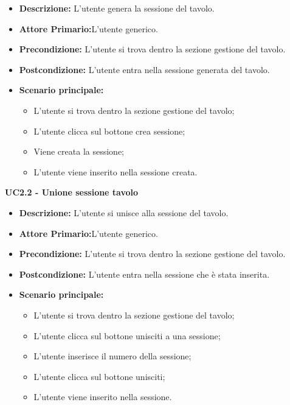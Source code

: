 \begin{itemize}
    \item \textbf{Descrizione:} L'utente genera la sessione del tavolo.
    \item \textbf{Attore Primario:}L'utente generico.
    \item \textbf{Precondizione:} L'utente si trova dentro la sezione gestione del tavolo.
    \item \textbf{Postcondizione:} L'utente entra nella sessione generata del tavolo.
    \item \textbf{Scenario principale:}
    \begin{itemize}
        \item L'utente si trova dentro la sezione gestione del tavolo;
        \item L'utente clicca sul bottone crea sessione;
        \item Viene creata la sessione;
        \item L'utente viene inserito nella sessione creata.
    \end{itemize}
\end{itemize}
\textbf{UC2.2 - Unione sessione tavolo}
\begin{itemize}
    \item \textbf{Descrizione:} L'utente si unisce alla sessione del tavolo.
    \item \textbf{Attore Primario:}L'utente generico.
    \item \textbf{Precondizione:} L'utente si trova dentro la sezione gestione del tavolo.
    \item \textbf{Postcondizione:} L'utente entra nella sessione che è stata inserita.
    \item \textbf{Scenario principale:}
    \begin{itemize}
        \item L'utente si trova dentro la sezione gestione del tavolo;
        \item L'utente clicca sul bottone unisciti a una sessione;
        \item L'utente inserisce il numero della sessione;
        \item L'utente clicca sul bottone unisciti;
        \item L'utente viene inserito nella sessione.
    \end{itemize}
\end{itemize}
